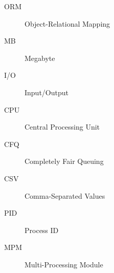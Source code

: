 \begin{description}
  \item[ORM] Object-Relational Mapping %
  \item[MB] Megabyte
  \item[I/O] Input/Output
  \item[CPU] Central Processing Unit
  \item[CFQ] Completely Fair Queuing
  \item[CSV] Comma-Separated Values
  \item[PID] Process ID
  \item[MPM] Multi-Processing Module
\end{description}



